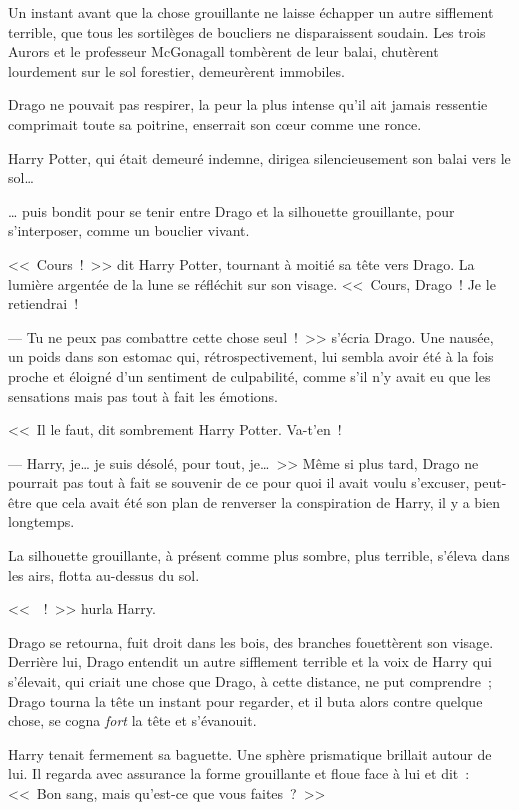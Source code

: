 \begin{em}
Un instant avant que la chose grouillante ne laisse échapper un autre sifflement terrible, que tous les sortilèges de boucliers ne disparaissent soudain. Les trois Aurors et le professeur McGonagall tombèrent de leur balai, chutèrent lourdement sur le sol forestier, demeurèrent immobiles.

Drago ne pouvait pas respirer, la peur la plus intense qu'il ait jamais ressentie comprimait toute sa poitrine, enserrait son cœur comme une ronce.

Harry Potter, qui était demeuré indemne, dirigea silencieusement son balai vers le sol…

… puis bondit pour se tenir entre Drago et la silhouette grouillante, pour s'interposer, comme un bouclier vivant.

<<~Cours~!~>> dit Harry Potter, tournant à moitié sa tête vers Drago. La lumière argentée de la lune se réfléchit sur son visage. <<~Cours, Drago~! Je le retiendrai~!

--- Tu ne peux pas combattre cette chose seul~!~>> s'écria Drago. Une nausée, un poids dans son estomac qui, rétrospectivement, lui sembla avoir été à la fois proche et éloigné d'un sentiment de culpabilité, comme s'il n'y avait eu que les sensations mais pas tout à fait les émotions.

<<~Il le faut, dit sombrement Harry Potter. Va-t'en~!

--- Harry, je… je suis désolé, pour tout, je…~>> Même si plus tard, Drago ne pourrait pas tout à fait se souvenir de ce pour quoi il avait voulu s'excuser, peut-être que cela avait été son plan de renverser la conspiration de Harry, il y a bien longtemps.

La silhouette grouillante, à présent comme plus sombre, plus terrible, s'éleva dans les airs, flotta au-dessus du sol.

<<~~!~>> hurla Harry.

Drago se retourna, fuit droit dans les bois, des branches fouettèrent son visage. Derrière lui, Drago entendit un autre sifflement terrible et la voix de Harry qui s'élevait, qui criait une chose que Drago, à cette distance, ne put comprendre~; Drago tourna la tête un instant pour regarder, et il buta alors contre quelque chose, se cogna \emph{fort} la tête et s'évanouit.
\end{em}

\later

Harry tenait fermement sa baguette. Une sphère prismatique brillait autour de lui. Il regarda avec assurance la forme grouillante et floue face à lui et dit~: <<~Bon sang, mais qu'est-ce que vous faites~?~>>

